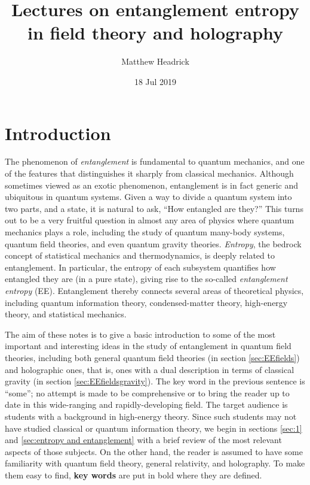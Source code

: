 \documentclass[11pt]{article}
\title{\boldmath Lectures on entanglement entropy in field theory and holography
}
\author{Matthew Headrick}
\affiliation{Martin Fisher School of Physics, Brandeis University, Waltham MA, USA}
\date{18 Jul 2019}
\begin{document}
 
\maketitle
\raggedbottom
\newpage

\section{Introduction}
\label{sec:intro}

The phenomenon of \emph{entanglement} is fundamental to quantum mechanics, and one of the features that distinguishes it sharply from classical mechanics. Although sometimes viewed as an exotic phenomenon, entanglement is in fact generic and ubiquitous in quantum systems. Given a way to divide a quantum system into two parts, and a state, it is natural to ask, ``How entangled are they?'' This turns out to be a very fruitful question in almost any area of physics where quantum mechanics plays a role, including the study of quantum many-body systems, quantum field theories, and even quantum gravity theories. \emph{Entropy}, the bedrock concept of statistical mechanics and thermodynamics, is deeply related to entanglement. In particular, the entropy of each subsystem quantifies how entangled they are (in a pure state), giving rise to the so-called \emph{entanglement entropy} (EE). Entanglement thereby connects several areas of theoretical physics, including quantum information theory, condensed-matter theory, high-energy theory, and statistical mechanics.

The aim of these notes is to give a basic introduction to some of the most important and interesting ideas in the study of entanglement in quantum field theories, including both general quantum field theories (in section \ref{sec:EEfields}) and holographic ones, that is, ones with a dual description in terms of classical gravity (in section \ref{sec:EEfieldsgravity}). The key word in the previous sentence is ``some''; no attempt is made to be comprehensive or to bring the reader up to date in this wide-ranging and rapidly-developing field. The target audience is students with a background in high-energy theory. Since such students may not have studied classical or quantum information theory, we begin in sections \ref{sec:1} and \ref{sec:entropy and entanglement} with a brief review of the most relevant aspects of those subjects. On the other hand, the reader is assumed to have some familiarity with quantum field theory, general relativity, and holography. To make them easy to find, \textbf{key words} are put in bold where they are defined.
\end{document}
